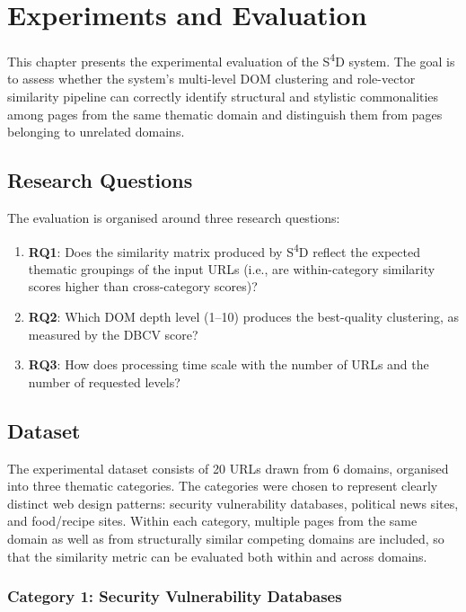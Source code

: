 \chapter{Experiments and Evaluation}
\label{ch:experiments}

This chapter presents the experimental evaluation of the S\textsuperscript{4}D system. The goal is to assess whether the system's multi-level DOM clustering and role-vector similarity pipeline can correctly identify structural and stylistic commonalities among pages from the same thematic domain and distinguish them from pages belonging to unrelated domains.

\section{Research Questions}
\label{sec:research-questions}

The evaluation is organised around three research questions:

\begin{enumerate}
    \item \textbf{RQ1}: Does the similarity matrix produced by S\textsuperscript{4}D reflect the expected thematic groupings of the input URLs (i.e., are within-category similarity scores higher than cross-category scores)?
    \item \textbf{RQ2}: Which DOM depth level (1--10) produces the best-quality clustering, as measured by the DBCV score?
    \item \textbf{RQ3}: How does processing time scale with the number of URLs and the number of requested levels?
\end{enumerate}

\section{Dataset}
\label{sec:dataset}

The experimental dataset consists of 20 URLs drawn from 6 domains, organised into three thematic categories. The categories were chosen to represent clearly distinct web design patterns: security vulnerability databases, political news sites, and food/recipe sites. Within each category, multiple pages from the same domain as well as from structurally similar competing domains are included, so that the similarity metric can be evaluated both within and across domains.

\subsection{Category 1: Security Vulnerability Databases}
\label{subsec:cat-security}

